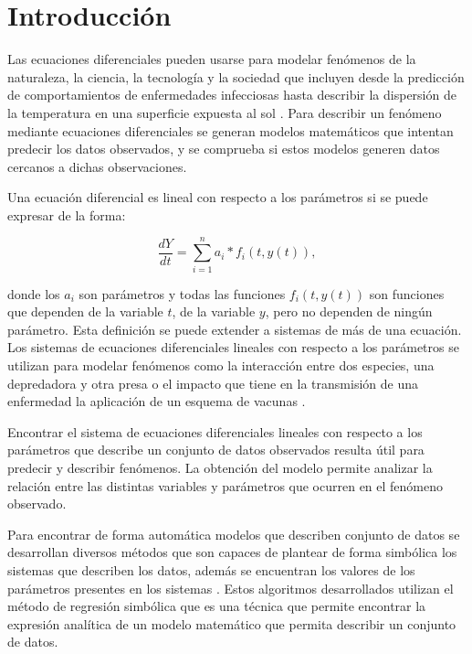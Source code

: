\chapter*{Introducción}\label{chapter:introduction}

\qquad

Las ecuaciones diferenciales pueden usarse para modelar fenómenos de la naturaleza, la ciencia, la tecnología y la sociedad que incluyen desde la predicción de comportamientos de enfermedades infecciosas \cite{weiss2013sir} hasta describir la dispersión de la temperatura en una superficie expuesta al sol \cite{p-transferencia-calor}. Para describir un fenómeno mediante ecuaciones diferenciales se generan modelos matemáticos que intentan predecir los datos observados, y se comprueba si estos modelos generen datos cercanos a dichas observaciones.

Una ecuación diferencial es lineal con respecto a los parámetros si se puede expresar de la forma:

$$\frac{dY}{dt} = \sum_{i=1}^{n} a_i * f_i(t, y(t)),$$

donde los $a_i$ son parámetros y todas las funciones $f_i(t,y(t))$ son funciones que dependen de la variable $t$, de la variable $y$, pero no dependen de ningún parámetro. Esta definición se puede extender a sistemas de más de una ecuación. Los sistemas de ecuaciones diferenciales lineales con respecto a los parámetros se utilizan para modelar fenómenos como la interacción entre dos especies, una depredadora y otra presa \cite{Hoppensteadt:2006} o el impacto que tiene en la transmisión de una enfermedad la aplicación de un esquema de vacunas \cite{kuddus2021mathematical}.

Encontrar el sistema de ecuaciones diferenciales lineales con respecto a los parámetros que describe un conjunto de datos observados resulta útil para predecir y describir fenómenos. La obtención del modelo permite analizar la relación entre las distintas variables y parámetros que ocurren en el fenómeno observado.

Para encontrar de forma automática modelos que describen conjunto de datos se desarrollan diversos métodos que son capaces de plantear de forma simbólica los sistemas que describen los datos, además se encuentran los valores de los parámetros presentes en los sistemas \cite{gplearn, schmidt2013eureqa}. Estos algoritmos desarrollados utilizan el método de regresión simbólica que es una técnica que permite encontrar la expresión analítica de un modelo matemático que permita describir un conjunto de datos.

